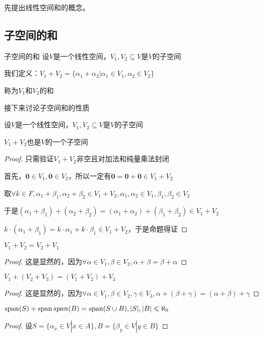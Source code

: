 \documentclass[12pt, a4paper, oneside, UTF8]{ctexbook}
\begin{document}
		先提出线性空间和的概念。
		\subsection{子空间的和}
			\begin{defn}{子空间的和}{}
				设$V$是一个线性空间，$V_1,V_2 \subseteq V$是$V$的子空间

				我们定义：$V_1 + V_2 = \{\alpha_1+\alpha_2 | \alpha_1 \in V_1,\alpha _2 \in V_2\}$

				称为$V_1$和$V_2$的和
			\end{defn}
			接下来讨论子空间和的性质
			\begin{para}{0}
				\point{}
					\begin{proposition}
						设$V$是一个线性空间，$V_1,V_2 \subseteq V$是$V$的子空间

						$V_1+V_2$也是$V$的一个子空间
					\end{proposition}
					\begin{proof}
						只需验证$V_1+V_2$非空且对加法和纯量乘法封闭

						首先，$\mathbf{0}\in V_1 ,\mathbf{0}\in V_2$，所以一定有$\mathbf{0}=\mathbf{0}+\mathbf{0} \in V_1+V_2$

						取$\forall k \in F,\alpha_1+\beta_1,\alpha_2+\beta_2 \in V_1+ V_2,\alpha_1,\alpha_2 \in V_1,\beta_1,\beta_2 \in V_2$

						于是$(\alpha_1+\beta_1)+(\alpha_2+\beta_2)=(\alpha_1+\alpha_2)+(\beta_1+\beta_2)\in V_1+V_2$

						$k\cdot (\alpha_1+\beta_1)=k\cdot \alpha_1+k \cdot \beta_1 \in V_1+V_2$，于是命题得证
					\end{proof}
				\point{}
					\begin{proposition}
						$V_1+V_2=V_2+V_1$
					\end{proposition}
					\begin{proof}
						这是显然的，因为$\forall \alpha \in V_1,\beta \in V_2,\alpha +\beta =\beta +\alpha $
					\end{proof}
				\point{}
					\begin{proposition}
						$V_1+(V_2+V_3)=(V_1+V_2)+V_3$
					\end{proposition}
					\begin{proof}
						这是显然的，因为$\forall \alpha \in V_1,\beta \in V_2,\gamma \in V_3,\alpha +(\beta+\gamma ) =(\alpha +\beta) +\gamma $
					\end{proof}
				\point{}
					\begin{proposition}
						$\operatorname{span}(S)+\operatorname{span}{span}(B)=\operatorname{span}(S \cup B),|S|,|B| \leqslant \aleph_0$
					\end{proposition}
					\begin{proof}
						设$S=\{\alpha_x \in V| x\in A\},B=\{\beta_y \in V| y \in B\}$


\end{proof}
\end{para}
\end{document}
